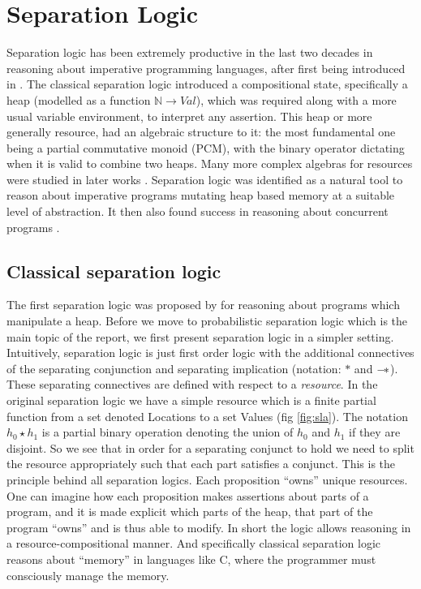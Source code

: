 \section{Separation Logic}
Separation logic has been extremely productive in the last two decades in reasoning about imperative programming languages, after first being introduced in \citep{og_sl}.
The classical separation logic introduced a compositional state, specifically a heap (modelled as a function $\mathbb{N} \to Val$), which was required along with a more
usual variable environment, to interpret any assertion. This heap or more generally resource, had an algebraic structure to it: the most fundamental one being
a partial commutative monoid (PCM), with the binary operator dictating when it is valid to combine two heaps. Many more complex algebras for resources were studied in
later works \citep{abstract_sl, abstract_sl2}. Separation logic was identified as a natural tool to reason about imperative programs mutating heap based memory
at a suitable level of abstraction. It then also found success in reasoning about concurrent programs \citep{csl}.

\subsection{Classical separation logic}
The first separation logic was proposed by \citet{og_sl} for reasoning about programs which manipulate a heap. Before we move to probabilistic separation logic which is the main topic
of the report, we first present separation logic in a simpler setting. Intuitively, separation logic is just first order logic with the
additional connectives of the separating conjunction and separating implication (notation: $*$ and $\mathbin{-\!*}$). These separating connectives
are defined with respect to a \emph{resource}. In the original separation logic we have a simple resource which is a finite partial function from
a set denoted Locations to a set Values (fig \ref{fig:sla}). The notation $h_0 \star h_1$ is a partial binary operation denoting
the union of $h_0$ and $h_1$ if they are disjoint. So we see that in order for a separating conjunct to hold we need to split the resource appropriately such
that each part satisfies a conjunct. This is the principle behind all separation logics. Each proposition ``owns'' unique resources. One can imagine how each proposition
makes assertions about parts of a program, and it is made explicit which parts of the heap, that part of the program ``owns'' and is thus able to modify. In short the logic allows
reasoning in a resource-compositional manner. And specifically classical separation logic reasons about ``memory'' in languages like C, where the programmer
must consciously manage the memory.

